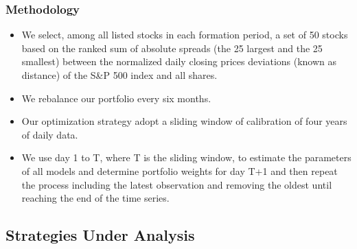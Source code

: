 \documentclass[pdf,10pt,xcolor=dvipsnames,hide notes]{beamer}
\begin{document}
\begin{frame}[label=frame4h]
	\frametitle{Methodology}
	
	\begin{itemize}
		\justifying
		
		\vspace{0.3cm}
		
		\item We select, among all listed stocks in	each formation period, a set of 50 stocks based on the ranked sum of absolute spreads (the 25 largest and the 25 smallest) between the normalized
		daily closing prices deviations (known as distance) of the
		S\&P 500 index and all shares.
		
		\vspace{0.3cm}
		
		\item We rebalance our portfolio every six months.
		
		\vspace{0.3cm}
		
		\item Our optimization strategy adopt a sliding window of calibration of four years of daily data.
		
		\vspace{0.3cm}
		
		\item We use day 1 to T, where T is the sliding window, to
		estimate the parameters of all models and determine portfolio weights for
		day T+1 and then repeat the process including the latest observation and
		removing the oldest until reaching the end of the time series. 

		\end{itemize}
	
\end{frame}

\subsection{Strategies Under Analysis}
\end{document}
